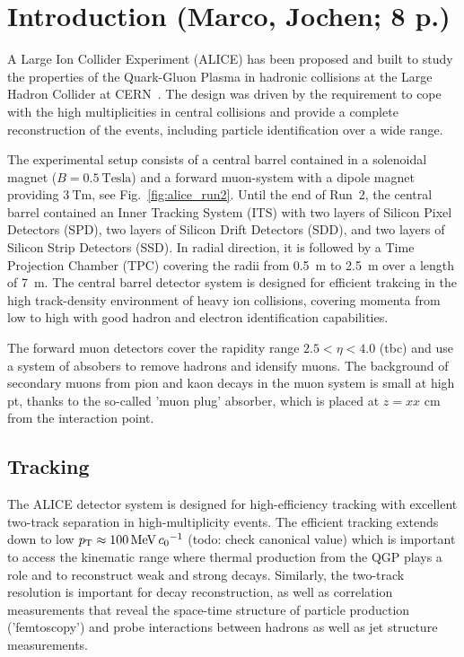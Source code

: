 \section{Introduction (Marco, Jochen; 8 p.)}

A Large Ion Collider Experiment (ALICE) has been proposed and built to study
the properties of the Quark-Gluon Plasma in hadronic collisions at the Large
Hadron Collider at CERN~\cite{Aamodt:2008zz}. The design was driven by the
requirement to cope with the high multiplicities in central \PbPb collisions
and provide a complete reconstruction of the events, including particle
identification over a wide \pt range.

The experimental setup consists of a central barrel contained in a solenoidal
magnet ($B = 0.5~\mathrm{Tesla}$) and a forward muon-system with a dipole magnet
providing $3~\mathrm{Tm}$, see Fig.~\ref{fig:alice_run2}. Until the end of Run~2,
the central barrel contained an Inner Tracking System (ITS) with two layers of
Silicon Pixel Detectors (SPD), two layers of Silicon Drift Detectors (SDD), and
two layers of Silicon Strip Detectors (SSD). In radial direction, it is followed
by a Time Projection Chamber (TPC) covering the radii from 0.5~m to 2.5~m over a
length of 7~m.
The central barrel detector system is designed for efficient trakcing in the high track-density environment of heavy ion collisions, covering momenta from low to high \pt{} with good hadron and electron identification capabilities.

The forward muon detectors cover the rapidity range $2.5 < \eta < 4.0$ (tbc) and use a system of absobers to remove hadrons and idensify muons.
The background of secondary muons from pion and kaon decays in the muon system is small at high pt, thanks to the so-called 'muon plug' absorber, which is placed at $z = xx$ cm from the interaction point.

\subsection{Tracking}

The ALICE detector system is designed for high-efficiency tracking with excellent two-track separation in high-multiplicity events. The efficient tracking extends down to low $\pt \approx \SI{100}{\mega\eV\per\clight}$ (todo: check canonical value) which is important to access the kinematic range where thermal production from the QGP plays a role and to reconstruct weak and strong decays.
Similarly, the two-track resolution is important for decay reconstruction, as well as correlation measurements that reveal the space-time structure of particle production ('femtoscopy') and probe interactions between hadrons as well as jet structure measurements.

